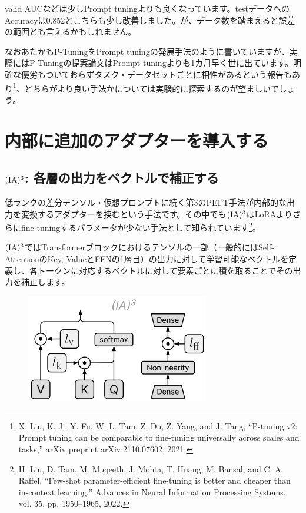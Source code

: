 \documentclass[a5paper,twoside,dvipdfmx]{jsarticle}
\begin{document}
valid AUCなどは少しPrompt tuningよりも良くなっています。testデータへのAccuracyは0.852とこちらも少し改善しました。が、データ数を踏まえると誤差の範囲とも言えるかもしれません。

なおあたかもP-TuningをPrompt tuningの発展手法のように書いていますが、実際にはP-Tuningの提案論文はPrompt tuningよりも1カ月早く世に出ています。明確な優劣もついておらずタスク・データセットごとに相性があるという報告もあり\footnote{X. Liu, K. Ji, Y. Fu, W. L. Tam, Z. Du, Z. Yang, and J. Tang, “P-tuning v2: Prompt tuning can be comparable to fine-tuning universally across scales and tasks,” arXiv preprint arXiv:2110.07602, 2021.}、どちらがより良い手法かについては実験的に探索するのが望ましいでしょう。

\newpage

\section{内部に追加のアダプターを導入する}

\subsection{$\rm{(IA)^3}$: 各層の出力をベクトルで補正する}

低ランクの差分テンソル・仮想プロンプトに続く第3のPEFT手法が内部的な出力を変換するアダプターを挟むという手法です。その中でも$\rm{(IA)^3}$はLoRAよりさらにfine-tuningするパラメータが少ない手法として知られています\footnote{H. Liu, D. Tam, M. Muqeeth, J. Mohta, T. Huang, M. Bansal, and C. A. Raffel, “Few-shot parameter-efficient fine-tuning is better and cheaper than in-context learning,” Advances in Neural Information Processing Systems, vol. 35, pp. 1950–1965, 2022.}。

$\rm{(IA)^3}$ではTransformerブロックにおけるテンソルの一部（一般的にはSelf-AttentionのKey, ValueとFFNの1層目）の出力に対して学習可能なベクトルを定義し、各トークンに対応するベクトルに対して要素ごとに積を取ることでその出力を補正します。


\begin{figure}[h]
  \centering
  \includegraphics[width=80mm]{../C105Fig/gray/ia3_image.png}
 \end{figure} 
\end{document}
